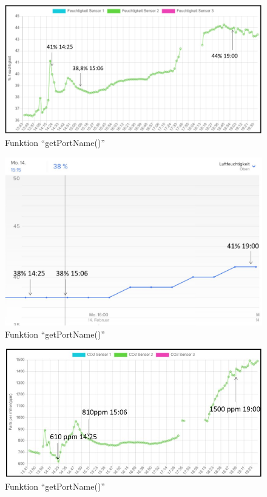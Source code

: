 \documentclass[]{article}
\begin{document}
			\begin{figure}[!h]
				\centering
				\includegraphics[scale=0.18]{images/Luftfeu_proj}
				\caption{Funktion “getPortName()”}
				\label{img:luftfeu_proj}
			\end{figure}
			\begin{figure}[!h]
				\centering
				\includegraphics[scale=0.18]{images/Luftfeu_NETATMO}
				\caption{Funktion “getPortName()”}
				\label{img:Luftfeu_NETATMO}
			\end{figure}
			\begin{figure}[!h]
				\centering
				\includegraphics[scale=0.18]{images/CO2_proj}
				\caption{Funktion “getPortName()”}
				\label{img:CO2_proj}
			\end{figure}
\end{document}
